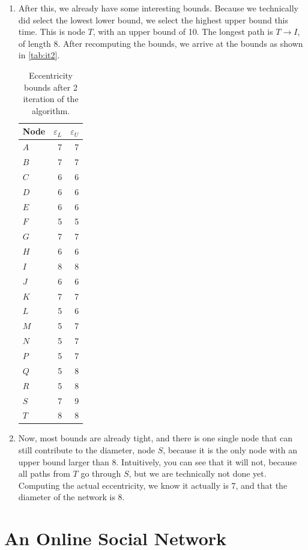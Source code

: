 \documentclass[12pt,a4paper,hidelinks]{article}
\begin{document}
\begin{enumerate}
	\item After this, we already have some interesting bounds.  Because we technically did select the lowest lower bound, we select the highest upper bound this time. This is node $T$, with an upper bound of 10. The longest path is $T \rightarrow I$, of length 8. After recomputing the bounds, we arrive at the bounds as shown in \autoref{tab:it2}.
	
		\begin{table}
			\centering
			\begin{tabular}{l | r | r}
				Node & $\varepsilon_L$ & $\varepsilon_U$ \\
				\hline
				$A$ & 7 & 7 \\
				$B$ & 7 & 7 \\
				$C$ & 6 & 6 \\
				$D$ & 6 & 6 \\
				$E$ & 6 & 6 \\
				$F$ & 5 & 5 \\
				$G$ & 7 & 7 \\
				$H$ & 6 & 6 \\
				$I$ & 8 & 8 \\
				$J$ & 6 & 6 \\
				$K$ & 7 & 7 \\
				$L$ & 5 & 6 \\
				$M$ & 5 & 7 \\
				$N$ & 5 & 7 \\
				$P$ & 5 & 7 \\
				$Q$ & 5 & 8 \\
				$R$ & 5 & 8 \\
				$S$ & 7 & 9 \\
				$T$ & 8 & 8 \\
			\end{tabular}
			\caption{Eccentricity bounds after 2 iteration of the algorithm.}
			\label{tab:it2}
		\end{table}
	
	\item Now, most bounds are already tight, and there is one single node that can still contribute to the diameter, node $S$, because it is the only node with an upper bound larger than 8. Intuitively, you can see that it will not, because all paths from $T$ go through $S$, but we are technically not done yet. Computing the actual eccentricity, we know it actually is 7, and that the diameter of the network is 8.
\end{enumerate}

\section{An Online Social Network}
\end{document}
